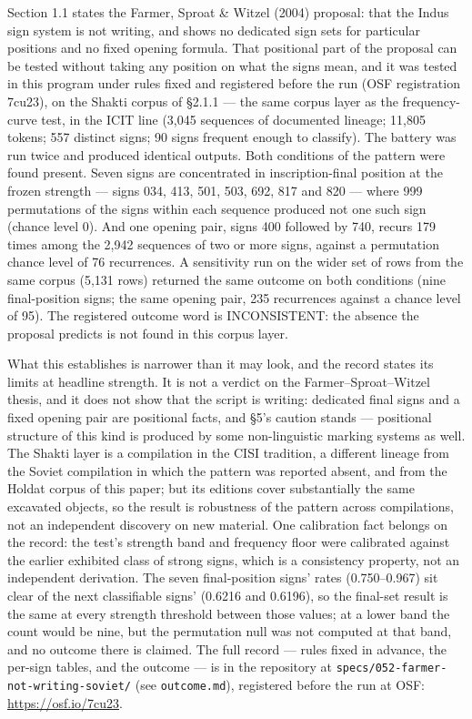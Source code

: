 \documentclass[11pt]{article}
\begin{document}
Section 1.1 states the Farmer, Sproat \& Witzel (2004) proposal:
that the Indus sign system is not writing, and shows no dedicated
sign sets for particular positions and no fixed opening formula.
That positional part of the proposal can be tested without taking
any position on what the signs mean, and it was tested in this
program under rules fixed and registered before the run (OSF registration 7cu23), on the
Shakti corpus of §2.1.1 --- the same corpus layer as the frequency-curve test, in the ICIT line (3,045 sequences of documented lineage;
11,805 tokens; 557 distinct signs; 90 signs frequent enough to
classify). The battery was run twice and produced identical
outputs. Both conditions of the pattern were found present.
Seven signs are concentrated in inscription-final position at
the frozen strength --- signs 034, 413, 501, 503, 692, 817 and
820 --- where 999 permutations of the signs within each sequence
produced not one such sign (chance level 0). And one opening
pair, signs 400 followed by 740, recurs 179 times among the
2,942 sequences of two or more signs, against a permutation
chance level of 76 recurrences. A sensitivity run on the wider
set of rows from the same corpus (5,131 rows) returned the same
outcome on both conditions (nine final-position signs; the same
opening pair, 235 recurrences against a chance level of 95). The
registered outcome word is INCONSISTENT: the absence the
proposal predicts is not found in this corpus layer.

What this establishes is narrower than it may look, and the
record states its limits at headline strength. It is not a
verdict on the Farmer--Sproat--Witzel thesis, and it does not
show that the script is writing: dedicated final signs and a
fixed opening pair are positional facts, and §5's caution stands
--- positional structure of this kind is produced by some
non-linguistic marking systems as well. The Shakti layer is a
compilation in the CISI tradition, a different lineage from the
Soviet compilation in which the pattern was reported absent, and
from the Holdat corpus of this paper; but its editions cover
substantially the same excavated objects, so the result is
robustness of the pattern across compilations, not an
independent discovery on new material. One calibration fact
belongs on the record: the test's strength band and frequency
floor were calibrated against the earlier exhibited class of
strong signs, which is a consistency property, not an
independent derivation. The seven final-position signs' rates
(0.750--0.967) sit clear of the next classifiable signs'
(0.6216 and 0.6196), so the final-set result is the same at
every strength threshold between those values; at a lower band
the count would be nine, but the permutation null was not
computed at that band, and no outcome there is claimed. The
full record --- rules fixed in advance, the per-sign tables,
and the outcome --- is in the repository at
\texttt{specs/052-farmer-not-writing-soviet/} (see
\texttt{outcome.md}), registered before the run at OSF:
\url{https://osf.io/7cu23}.
\end{document}
